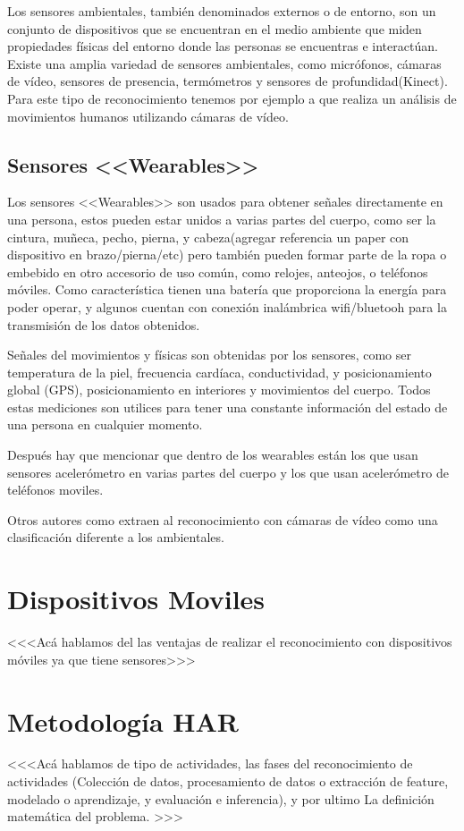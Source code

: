 Los sensores ambientales, también denominados externos o de entorno, son un conjunto de dispositivos que se encuentran en el medio ambiente que miden propiedades físicas del entorno donde las personas se encuentras e interactúan. Existe una amplia variedad de sensores ambientales, como micrófonos, cámaras de vídeo, sensores de presencia, termómetros y sensores de profundidad(Kinect). Para este tipo de reconocimiento tenemos por ejemplo a \cite{Poppe2007} que realiza un análisis de movimientos humanos utilizando cámaras de vídeo.

\subsection{Sensores <<Wearables>>}

Los sensores <<Wearables>> son usados para obtener señales directamente en una persona, estos pueden estar unidos a varias partes del cuerpo, como ser la cintura, muñeca, pecho, pierna, y cabeza(agregar referencia un paper con dispositivo en brazo/pierna/etc) pero también pueden formar parte de la ropa o embebido en otro accesorio de uso común, como relojes, anteojos, o teléfonos móviles. Como característica tienen una batería que proporciona la energía para poder operar, y algunos cuentan con conexión inalámbrica wifi/bluetooh para la transmisión de los datos obtenidos.

Señales del movimientos y físicas son obtenidas por los sensores, como ser temperatura de la piel, frecuencia cardíaca, conductividad, y posicionamiento global (GPS), posicionamiento en interiores y movimientos del cuerpo. Todos estas mediciones son utilices para tener una constante información del estado de una persona en cualquier momento.

Después hay que mencionar que dentro de los wearables están los que usan sensores acelerómetro en varias partes del cuerpo y los que usan acelerómetro de teléfonos moviles.

Otros autores como \cite{karmul2010} extraen al reconocimiento con cámaras de vídeo como una clasificación diferente a los ambientales. 

\section{Dispositivos Moviles}
<<<Acá hablamos del las ventajas de realizar el reconocimiento con dispositivos móviles ya que tiene sensores>>>


\section{Metodología HAR}
<<<Acá hablamos de tipo de actividades, las fases del reconocimiento de actividades (Colección de datos, procesamiento de datos o extracción de feature, modelado o aprendizaje, y evaluación e inferencia), y por ultimo La definición matemática del problema. >>>

